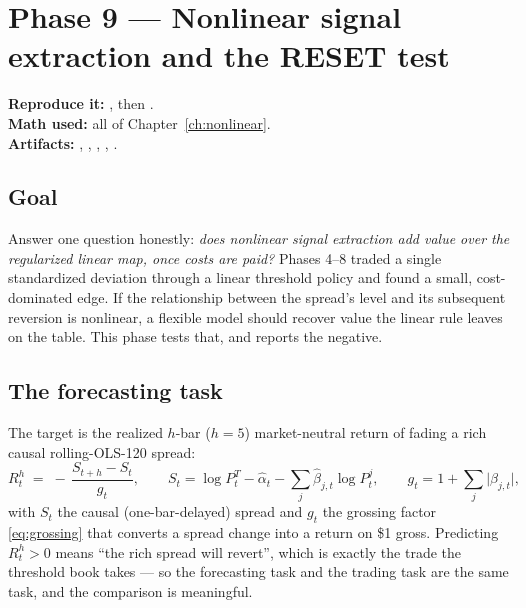 \section{Phase 9 --- Nonlinear signal extraction and the RESET test}
\label{ch:phase9}

\textbf{Reproduce it:} , then .\\
\textbf{Math used:} all of Chapter~\ref{ch:nonlinear}.\\
\textbf{Artifacts:} ,
,
,
,
.

\subsection{Goal}

Answer one question honestly: \emph{does nonlinear signal extraction add value over the
regularized linear map, once costs are paid?} Phases 4--8 traded a single standardized
deviation through a linear threshold policy and found a small, cost-dominated edge. If the
relationship between the spread's level and its subsequent reversion is nonlinear, a
flexible model should recover value the linear rule leaves on the table. This phase tests
that, and reports the negative.

\subsection{The forecasting task}

The target is the realized $h$-bar ($h=5$) market-neutral return of fading a rich causal
rolling-OLS-120 spread:
\begin{equation}
  R_t^{h} \;=\; -\,\frac{S_{t+h}-S_t}{g_t},
  \qquad
  S_t = \log P^{T}_t - \hat\alpha_t - \sum_j \hat\beta_{j,t}\log P^{j}_t,
  \qquad
  g_t = 1+\sum_j\lvert\hat\beta_{j,t}\rvert ,
  \label{eq:nonlin_target}
\end{equation}
with $S_t$ the causal (one-bar-delayed) spread and $g_t$ the grossing factor
\eqref{eq:grossing} that converts a spread change into a return on \$1 gross. Predicting
$R_t^h>0$ means ``the rich spread will revert'', which is exactly the trade the threshold
book takes --- so the forecasting task and the trading task are the same task, and the
comparison is meaningful.

